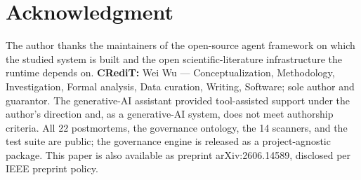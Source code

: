 \documentclass[conference]{IEEEtran}
\begin{document}
\section*{Acknowledgment}
The author thanks the maintainers of the open-source agent framework on
which the studied system is built and the open scientific-literature
infrastructure the runtime depends on. \textbf{CRediT:} Wei Wu ---
Conceptualization, Methodology, Investigation, Formal analysis, Data
curation, Writing, Software; sole author and guarantor. The generative-AI
assistant provided tool-assisted support under the author's direction and,
as a generative-AI system, does not meet authorship criteria. All 22
postmortems, the governance ontology, the 14 scanners, and the test suite
are public; the governance engine is released as a project-agnostic
package. This paper is also available as preprint arXiv:2606.14589,
disclosed per IEEE preprint policy.
\end{document}

